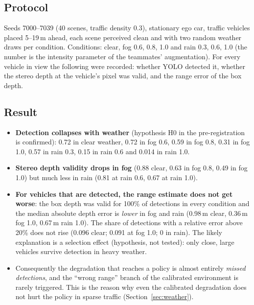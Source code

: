 \subsection{Protocol}
Seeds 7000--7039 (40 scenes, traffic density 0.3), stationary ego car, traffic vehicles placed 5--19\,m ahead, each scene perceived clean and with two random weather draws per condition. Conditions: clear, fog 0.6, 0.8, 1.0 and rain 0.3, 0.6, 1.0
(the number is the intensity parameter of the teammates' augmentation). For every vehicle in view the following were recorded: whether YOLO detected it, whether the stereo depth at the vehicle's pixel was valid, and the range error of the box depth.

\subsection{Result}


\begin{itemize}
\item \textbf{Detection collapses with weather} (hypothesis H0 in the pre-registration is confirmed): 0.72 in clear weather, 0.72 in fog 0.6, 0.59 in fog 0.8, 0.31 in fog 1.0, 0.57 in rain 0.3, 0.15 in rain 0.6 and 0.014 in rain 1.0.
\item \textbf{Stereo depth validity drops in fog} (0.88 clear, 0.63 in fog 0.8, 0.49 in fog 1.0) but much less in rain (0.81 at rain 0.6, 0.67 at rain 1.0).
\item \textbf{For vehicles that are detected, the range estimate does not get worse}: the box depth was valid for 100\% of detections in every condition and the median absolute depth error is \emph{lower} in fog and rain (0.98\,m clear, 0.36\,m fog 1.0, 0.67\,m rain 1.0). The share of detections with a relative error above 20\% does not rise (0.096 clear; 0.091 at fog 1.0; 0 in rain).
  The likely explanation is a selection effect (hypothesis, not tested): only close, large vehicles survive detection in heavy weather.
\item Consequently the degradation that reaches a policy is almost entirely \emph{missed detections}, and the ``wrong range'' branch of the calibrated environment is rarely triggered. This is the reason why even the calibrated degradation does not hurt the policy in sparse traffic (Section~\ref{sec:weather}).
\end{itemize}


